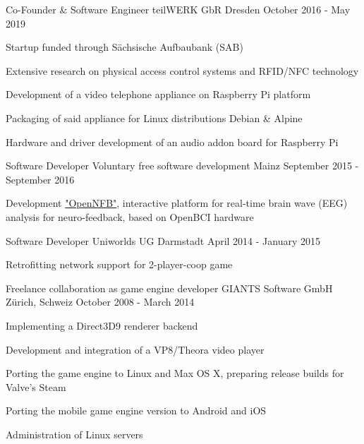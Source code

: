 \begin{cventries}
  \cventry
    {Co-Founder \& Software Engineer} %
    {teilWERK GbR} %
    {Dresden} %
    {October 2016 - May 2019} %
    {
      \begin{cvitems} %
        \item {Startup funded through Sächsische Aufbaubank (SAB) }
        \item {Extensive research on physical access control systems and RFID/NFC technology}
        \item {Development of a video telephone appliance on Raspberry Pi platform}
        \item {Packaging of said appliance for Linux distributions Debian \& Alpine }
        \item {Hardware and driver development of an audio addon board for Raspberry Pi }
      \end{cvitems}
    }

  \cventry
    {Software Developer} %
    {Voluntary free software development} %
    {Mainz} %
    {September 2015 - September 2016} %
    {
      \begin{cvitems} %
        \item {Development \href{https://github.com/strfry/OpenNFB}{"OpenNFB"}, interactive platform for real-time brain wave (EEG) analysis for neuro-feedback, based on OpenBCI hardware}
      \end{cvitems}
    }

  \cventry
    {Software Developer} %
    {Uniworlds UG} %
    {Darmstadt} %
    {April 2014 - January 2015} %
    {
      \begin{cvitems} %
        \item {Retrofitting network support for 2-player-coop game}
      \end{cvitems}
    }

  \cventry
    {Freelance collaboration as game engine developer} %
    {GIANTS Software GmbH} %
    {Zürich, Schweiz} %
    {October 2008 - March 2014} %
    {
      \begin{cvitems} %
        \item {Implementing a Direct3D9 renderer backend}
        \item {Development and integration of a VP8/Theora video player}
        \item {Porting the game engine to Linux and Max OS X, preparing release builds for Valve's Steam}
        \item {Porting the mobile game engine version to Android and iOS}
        \item {Administration of Linux servers}
      \end{cvitems}
    }


\end{cventries}
